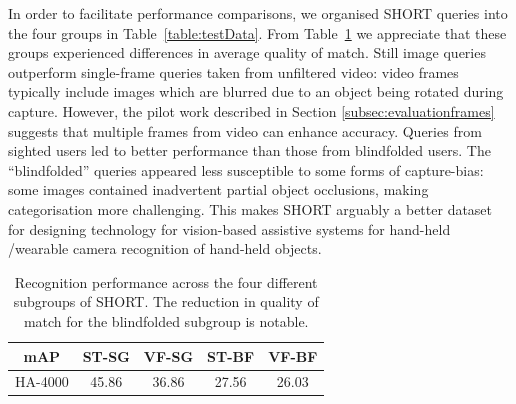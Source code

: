 In order to facilitate performance comparisons, we organised SHORT queries into the four groups in Table~\ref{table:testData}. From Table~\ref{table:sightedVSblindfolded} we appreciate that these groups experienced differences in average quality of match. Still image queries outperform single-frame queries taken from unfiltered video: video frames typically include images which are blurred due to an object being rotated during capture. However, the pilot work described in Section \ref{subsec:evaluationframes} suggests that multiple frames from video can enhance accuracy. Queries from sighted users led to better performance than those from blindfolded users. The ``blindfolded'' queries appeared less susceptible to some forms of  capture-bias: some images contained inadvertent partial object occlusions, making categorisation more challenging. This makes SHORT arguably a better dataset for designing technology for vision-based assistive systems for hand-held /wearable camera recognition of hand-held objects.


\begin{table}[]
\centering
  \begin{tabular}{ccccc}
   \toprule
    mAP & ST-SG & VF-SG & ST-BF & VF-BF \\
	\midrule
    HA-4000                    & 45.86    & 36.86   & 27.56 & 26.03\\
	\bottomrule
    \end{tabular}
    \caption{Recognition performance across the four different subgroups of SHORT. The reduction in quality of match for the blindfolded subgroup is notable.}
    \label{table:sightedVSblindfolded}
\end{table}


